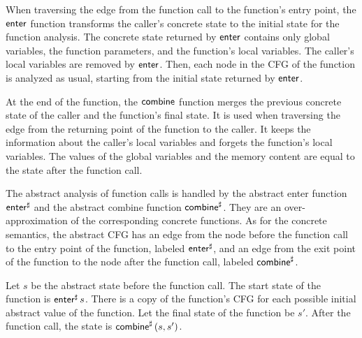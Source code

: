 When traversing the edge from the function call to the function's entry point, the $\textsf{enter}$ function transforms the caller's concrete state to the initial state for the function analysis.
The concrete state returned by $\textsf{enter}$ contains only global variables, the function parameters, and the function's local variables.
The caller's local variables are removed by $\textsf{enter}$.
Then, each node in the CFG of the function is analyzed as usual,
starting from the initial state returned by $\textsf{enter}$.

At the end of the function, the $\textsf{combine}$ function merges the previous concrete state of the caller and the function's final state.
It is used when traversing the edge from the returning point of the function to the caller.
It keeps the information about the caller's local variables and forgets the function's local variables.
The values of the global variables and the memory content are equal to the state after the function call.

The abstract analysis of function calls is handled by the abstract enter function $\textsf{enter}^\sharp$ and the abstract combine function $\textsf{combine}^\sharp$.
They are an over-approximation of the corresponding concrete functions.
As for the concrete semantics, the abstract CFG has an edge from the node before the function call to the entry point of the function, labeled $\textsf{enter}^\sharp$, and an edge from the exit point of the function to the node after the function call, labeled $\textsf{combine}^\sharp$.

Let $s$ be the abstract state before the function call.
The start state of the function is $\textsf{enter}^\sharp\,s$.
There is a copy of the function's CFG for each possible initial abstract value of the function.
Let the final state of the function be $s'$.
After the function call, the state is $\textsf{combine}^\sharp\,(s,s')$.


